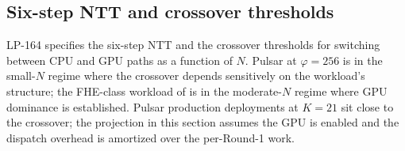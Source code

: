 \subsection{Six-step NTT and crossover thresholds}

LP-164 \cite{lp164} specifies the six-step NTT and the crossover thresholds for switching between CPU and GPU paths as a function of $N$. Pulsar at $\varphi = 256$ is in the small-$N$ regime where the crossover depends sensitively on the workload's structure; the FHE-class workload of \cite{luxfhebenchmarks} is in the moderate-$N$ regime where GPU dominance is established. Pulsar production deployments at $K = 21$ sit close to the crossover; the projection in this section assumes the GPU is enabled and the dispatch overhead is amortized over the per-Round-1 work.
